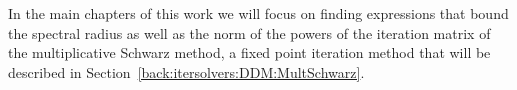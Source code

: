 In the main chapters of this work we will focus on finding expressions that bound the spectral radius as well as the norm of the powers of the iteration matrix of the multiplicative Schwarz method, a fixed point iteration method that will be described in Section~\ref{back:itersolvers:DDM:MultSchwarz}.



%
%
